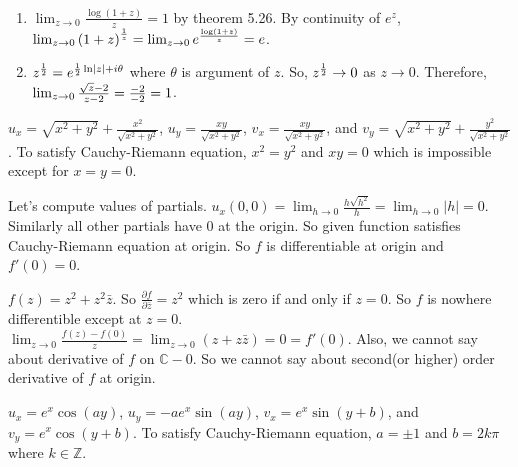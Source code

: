 \begin{problem}
	\hfill \\
	\begin{enumerate}
		\item $\lim_{z \rightarrow 0 } \frac{\log \left( 1 + z  \right) }{z} = 1$ by theorem 5.26. By continuity of $e^{z}$, $\lim_{z \rightarrow 0} \left( 1+z  \right) ^{1 \over z } = \lim_{z \rightarrow 0} e^{\log \left( 1+z  \right) \over z} = e$.
		\item $z^{1 \over 2 } = e^{ {1 \over 2 } \ln \lvert z \rvert + i \theta}$ where $\theta$ is argument of $z$.
			So, $z^{1\over 2} \rightarrow 0$ as $z \rightarrow 0$.
			Therefore, $\lim_{z\rightarrow 0} \frac{\sqrt{z} - 2}{z-2} = {-2 \over -2 } = 1$.
	\end{enumerate}
\end{problem}

\begin{problem}
	$u_x = \sqrt{x^2 + y^2 } +\frac{x^2}{\sqrt{x^2 + y^2}}$, $u_y = \frac{xy}{\sqrt{x^2 + y^2}}$, $v_x = \frac{xy}{\sqrt{x^2 + y^2}}$, and $v_y = \sqrt{x^2 + y^2} + \frac{y^2 }{ \sqrt{x^2 + y^2 }}$. To satisfy Cauchy-Riemann equation, $x^2 = y^2$ and $xy = 0$ which is impossible except for $x = y = 0$.
	
	Let's compute values of partials.
	$u_x\left( 0, 0 \right) = \lim_{h \rightarrow 0 } \frac{h\sqrt{h^{2}}}{h} = \lim_{h \rightarrow 0 } \lvert h \rvert = 0$. Similarly all other partials have $0$ at the origin. So given function satisfies Cauchy-Riemann equation at origin. So $f$ is differentiable at origin and $f'(0) = 0$.
\end{problem}

\begin{problem}
	$f(z) = z^{2} + z^{2} \bar{z}$. So $\frac{\partial f}{\partial \bar{z}} = z^{2}$ which is zero if and only if $z = 0$. So $f$ is nowhere differentible except at $z = 0$. $\lim_{z\rightarrow 0} \frac{f(z) - f(0)}{z} = \lim_{z \rightarrow 0} \left( z + z \bar{z} \right) = 0 = f'(0)$. 
	Also, we cannot say about derivative of $f$ on $\mathbb{C} - 0$. So we cannot say about second(or higher) order derivative of $f$ at origin.
\end{problem}

\begin{problem}
	$u_x = e^{x} \cos \left( ay \right) $, $u_y = -a e^{x} \sin \left( ay \right)$, $v_x = e^{x}\sin \left( y+b \right)$, and $v_y = e^{x} \cos \left( y+b \right)$. To satisfy Cauchy-Riemann equation, $a = \pm 1$ and $b = 2k\pi$ where $k\in \mathbb{Z}$.	
\end{problem}


